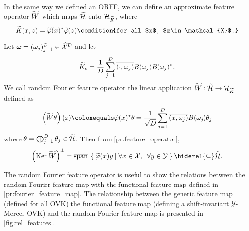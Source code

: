 \paragraph{}
In the same way we defined an \acs{ORFF}, we can define an approximate feature
operator $\widetilde{W}$ which maps $\widetilde{\mathcal{H}}$ onto
$\mathcal{H}_{\widetilde{K}}$, where 
\begin{dmath*}
    \tildeK{\omega}(x,z)=
    \tildePhi{\omega}(x)^\adjoint\tildePhi{\omega}(z)\condition{for
    all $x$, $z\in\mathcal{X}$.}
\end{dmath*}
\begin{definition}
    Let $\boldsymbol{\mathbf{\omega}}=(\omega_j)_{j=1}^D\in\widehat{\mathcal{X}}^D$ and let
    \begin{dmath*}
        \tildeK{\omega}_e=\frac{1}{D}\sum_{j=1}^D
        \conj{\pairing{\cdot,\omega_j}}B(\omega_j)B(\omega_j)^*.
    \end{dmath*}
    We call random Fourier feature operator the linear application
    $\widetilde{W}:\widetilde{\mathcal{H}}\to \mathcal{H}_{\widetilde{K}}$ defined
    as
    \begin{dmath*}
        \left(\tildeW{\omega} \theta\right)(x)
        \colonequals \tildePhi{\omega}(x)^\adjoint \theta
        =\frac{1}{\sqrt{D}}\sum_{j=1}^D
        \conj{\pairing{x,\omega_j}}B(\omega_j)\theta_j
    \end{dmath*}
    where
    $\theta=\operatorname*{\bigoplus}_{j=1}^D\theta_j \in\widetilde{\mathcal{H}}$.
    Then from \cref{pr:feature_operator},
    \begin{dmath*}
        \left(\Ker \tildeW{\omega}\right)^\perp 
        = \lspan\Set{\tildePhi{\omega}(x)y | \forall x\in\mathcal{X},\enskip
        \forall y\in\mathcal{Y}} \hiderel{\subseteq} \tildeH{\omega}.
    \end{dmath*}
\end{definition}
The random Fourier feature operator is useful to show the relations between the
random Fourier feature map with the functional feature map defined in
\cref{pr:fourier_feature_map}. The relationship between the generic feature map
(defined for all \acl{OVK}) the functional feature map (defining a
shift-invariant $\mathcal{Y}$-Mercer \acl{OVK}) and the random Fourier feature
map is presented in \cref{fig:rel_features}.
